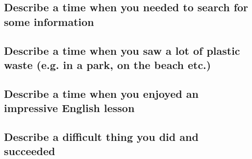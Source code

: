 \documentclass[conference]{IEEEtran}
\begin{document}
\subsection{Describe a time when you needed to search for some information}
\subsection{Describe a time when you saw a lot of plastic waste (e.g. in a park, on the beach
etc.)}
\subsection{Describe a time when you enjoyed an impressive English lesson}
\subsection{Describe a difficult thing you did and succeeded}
\end{document}
